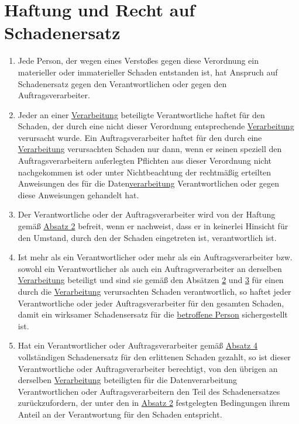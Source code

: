 \chapter{Haftung und Recht auf Schadenersatz}
\label{ch:82}


\begin{enumerate}

  \item Jede Person, der wegen eines Verstoßes gegen diese Verordnung ein materieller oder immaterieller Schaden
   entstanden ist, hat Anspruch auf Schadenersatz gegen den Verantwortlichen oder gegen den Auftragsverarbeiter.
  \label{itm:82-1}

  \item Jeder an einer \hyperref[itm:04-2]{Verarbeitung} beteiligte Verantwortliche haftet für den Schaden, der durch eine nicht dieser
   Verordnung entsprechende \hyperref[itm:04-2]{Verarbeitung} verursacht wurde. Ein Auftragsverarbeiter haftet für den durch eine
   \hyperref[itm:04-2]{Verarbeitung} verursachten Schaden nur dann, wenn er seinen speziell den Auftragsverarbeitern auferlegten Pflichten
   aus dieser Verordnung nicht nachgekommen ist oder unter Nichtbeachtung der rechtmäßig erteilten Anweisungen des für
   die Daten\hyperref[itm:04-2]{verarbeitung} Verantwortlichen oder gegen diese Anweisungen gehandelt hat.
  \label{itm:82-2}

  \item Der Verantwortliche oder der Auftragsverarbeiter wird von der Haftung gemäß \hyperref[itm:82-2]{Absatz 2}
   befreit, wenn er nachweist, dass er in keinerlei Hinsicht für den Umstand, durch den der Schaden eingetreten ist,
   verantwortlich ist.
  \label{itm:82-3}

  \item Ist mehr als ein Verantwortlicher oder mehr als ein Auftragsverarbeiter bzw. sowohl ein Verantwortlicher als
   auch ein Auftragsverarbeiter an derselben \hyperref[itm:04-2]{Verarbeitung} beteiligt und sind sie gemäß den Absätzen \hyperref[itm:82-2]
   {2} und \hyperref[itm:82-3]{3} für einen durch die \hyperref[itm:04-2]{Verarbeitung} verursachten Schaden verantwortlich, so haftet jeder
   Verantwortliche oder jeder Auftragsverarbeiter für den gesamten Schaden, damit ein wirksamer Schadensersatz für die
   \hyperref[itm:04-1]{betroffene Person} sichergestellt ist.
  \label{itm:82-4}

  \item Hat ein Verantwortlicher oder Auftragsverarbeiter gemäß \hyperref[itm:82-4]{Absatz 4} vollständigen
   Schadenersatz für den erlittenen Schaden gezahlt, so ist dieser Verantwortliche oder Auftragsverarbeiter berechtigt,
   von den übrigen an derselben \hyperref[itm:04-2]{Verarbeitung} beteiligten für die Datenverarbeitung Verantwortlichen oder
   Auftragsverarbeitern den Teil des Schadenersatzes zurückzufordern, der unter den in \hyperref[itm:82-2]{Absatz 2}
   festgelegten Bedingungen ihrem Anteil an der Verantwortung für den Schaden entspricht.
  \label{itm:82-5}


\end{enumerate}
